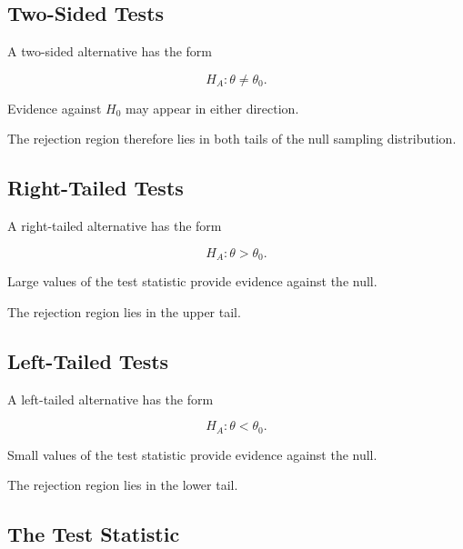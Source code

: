 \subsection{Two-Sided Tests}
\label{subsec:two-sided-tests}

A two-sided alternative has the form

\[
\boxed{
H_A:\theta\neq\theta_0.
}
\]

Evidence against \(H_0\) may appear in either direction.

The rejection region therefore lies in both tails of the null sampling
distribution.

\subsection{Right-Tailed Tests}
\label{subsec:right-tailed-tests}

A right-tailed alternative has the form

\[
\boxed{
H_A:\theta>\theta_0.
}
\]

Large values of the test statistic provide evidence against the null.

The rejection region lies in the upper tail.

\subsection{Left-Tailed Tests}
\label{subsec:left-tailed-tests}

A left-tailed alternative has the form

\[
\boxed{
H_A:\theta<\theta_0.
}
\]

Small values of the test statistic provide evidence against the null.

The rejection region lies in the lower tail.

\subsection{The Test Statistic}
\label{subsec:test-statistic}

